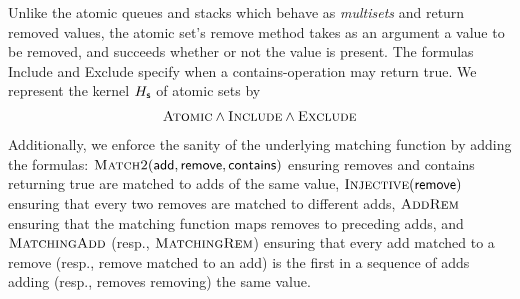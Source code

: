 \begin{example}

  Unlike the atomic queues and stacks which behave as \emph{multisets} and
  return removed values, the atomic set's {\sf remove} method takes as an
  argument a value to be removed, and succeeds whether or not the value is
  present. The formulas {\sc Include} and {\sc Exclude} specify when a {\sf
  contains}-operation may return {\sf true}. We represent the kernel $H_{\sf s}$
  of atomic sets by  
  \begin{align*}
    \textsc{Atomic} \land \textsc{Include} \land \textsc{Exclude}
  \end{align*}
  Additionally, we enforce the sanity of the underlying matching function by
  adding the formulas: $\textsc{Match2}({\sf add},{\sf
  remove},{\sf contains})$ ensuring removes and contains returning true
  are matched to adds of the same value, $\textsc{Injective}({\sf remove})$ 
  ensuring that every two removes are matched to different adds,
  $\textsc{AddRem}$ ensuring that the matching function maps removes to preceding
  adds, and 
  $\textsc{MatchingAdd}$ (resp., $\textsc{MatchingRem}$) ensuring that every add matched to a remove
  (resp., remove matched to an add) is the first in a sequence of adds adding 
  (resp., removes removing) the same value.

\end{example}

